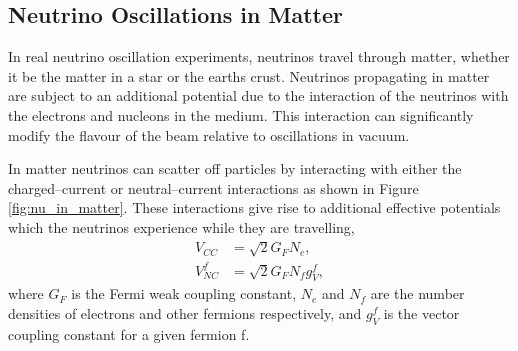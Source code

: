 {\subsection{Neutrino Oscillations in Matter}
In real neutrino oscillation experiments, neutrinos travel through matter,
whether it be the matter in a star or the earths crust. Neutrinos propagating in
matter are subject to an additional potential due to the interaction of the 
neutrinos with the electrons and nucleons in the medium.  This interaction can 
significantly modify the flavour of the beam relative to oscillations in 
vacuum.

In matter neutrinos can scatter off particles by interacting with either
the charged--current or neutral--current interactions as shown in Figure
\ref{fig:nu_in_matter}. These interactions give rise to additional effective
potentials which the neutrinos experience while they are travelling,
\begin{align}
	V_{CC} &= \sqrt{2} G_F N_e, \\
	V_{NC}^f &= \sqrt{2} G_F N_f g_V^f,
\end{align}
where $G_F$ is the Fermi weak coupling constant, $N_e$ and $N_f$ are the number
densities of electrons and other fermions respectively, and $g_V^f$ is the
vector coupling constant for a given fermion f.
\begin{figure}
	\centering


\end{figure}}
